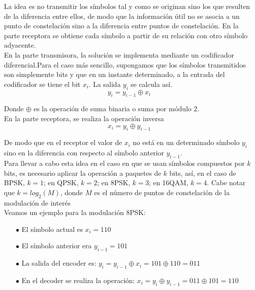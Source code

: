 La idea es no transmitir los símbolos tal y como se originan sino los que resulten de la diferencia entre ellos, de modo que la información útil no se asocia a un punto de constelación sino a la diferencia entre puntos de constelación. En la parte receptora se obtiene cada símbolo a partir de su relación con otro símbolo adyacente. \\

En la parte transmisora, la solución se implementa mediante un codificador diferencial.Para el caso más sencillo, supongamos que los símbolos transmitidos son simplemente bits y que en un instante determinado, a la entrada del codificador se tiene el bit $x_i$. La salida $y_i$ se calcula así. \\
\begin{equation} \label{capcuatro_treintauno}
	 y_{i} = y_{i-1} \oplus x_i
\end{equation}

Donde $ \oplus$ es la operación de suma binaria o suma por módulo 2. \\ En la parte receptora, se realiza la operación inversa \\
\begin{equation} \label{capcuatro_treintados}
	 x_{i} = y_{i} \oplus y_{i-1}
\end{equation}

De modo que en el receptor el valor de $x_i$ no está en un determinado símbolo $y_i$ sino en la diferencia con respecto al símbolo anterior $y_{i-1}$. \\

Para llevar a cabo esta idea en el caso en que se usan símbolos compuestos por $k$ bits, es necesario aplicar la operación a paquetes de $k$ bits, así, en el caso de BPSK, $k=1$; en QPSK, $k=2$; en 8PSK, $k=3$; en 16QAM, $k=4$. Cabe notar que $k=log_2(M)$, donde $M$ es el número de puntos de constelación de la modulación de interés \\

Veamos un ejemplo para la modulación 8PSK: \\

\begin{itemize}
	\item [$\bullet$] El símbolo actual es $x_i=110$
	\item [$\bullet$] El símbolo anterior era $y_{i-1}=101$
	\item [$\bullet$] La salida del encoder es: $y_i=y_{i-1} \oplus x_i = 101 \oplus 110=011$	
	\item [$\bullet$] En el decoder se realiza la operación: $x_i = y_i  \oplus y_{i-1} = 011 \oplus 101=110 $
\end{itemize}\\

